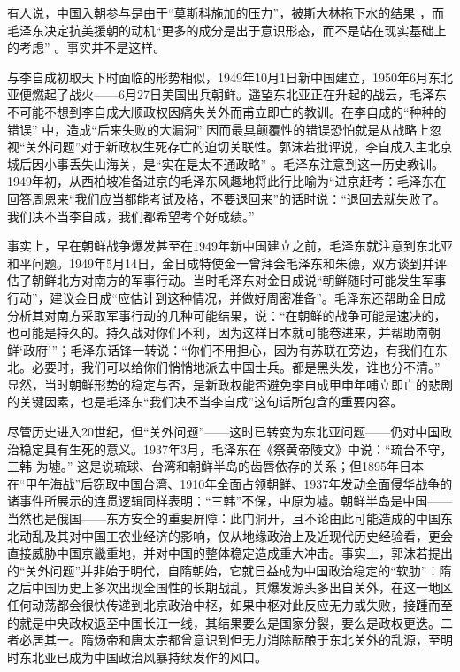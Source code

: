 \documentclass[UTF8, 12pt, a4paper]{ctexrep}
\begin{document}
有人说，中国入朝参与是由于“莫斯科施加的压力”，被斯大林拖下水的结果 ，而毛泽东决定抗美援朝的动机“更多的成分是出于意识形态，而不是站在现实基础上的考虑” 。事实并不是这样。

与李自成初取天下时面临的形势相似，1949年10月1日新中国建立，1950年6月东北亚便燃起了战火——6月27日美国出兵朝鲜。遥望东北亚正在升起的战云，毛泽东不可能不想到李自成大顺政权因痛失关外而甫立即亡的教训。在李自成的“种种的错误” 中，造成“后来失败的大漏洞” 因而最具颠覆性的错误恐怕就是从战略上忽视“关外问题”对于新政权生死存亡的迫切关联性。郭沫若批评说，李自成入主北京城后因小事丢失山海关，是“实在是太不通政略” 。毛泽东注意到这一历史教训。1949年初，从西柏坡准备进京的毛泽东风趣地将此行比喻为“进京赶考：毛泽东在回答周恩来“我们应当都能考试及格，不要退回来”的话时说：“退回去就失败了。我们决不当李自成，我们都希望考个好成绩。”

事实上，早在朝鲜战争爆发甚至在1949年新中国建立之前，毛泽东就注意到东北亚和平问题。1949年5月14日，金日成特使金一曾拜会毛泽东和朱德，双方谈到并评估了朝鲜北方对南方的军事行动。当时毛泽东对金日成说“朝鲜随时可能发生军事行动”，建议金日成“应估计到这种情况，并做好周密准备”。毛泽东还帮助金日成分析其对南方采取军事行动的几种可能结果，说：“在朝鲜的战争可能是速决的，也可能是持久的。持久战对你们不利，因为这样日本就可能卷进来，并帮助南朝鲜‘政府’”；毛泽东话锋一转说：“你们不用担心，因为有苏联在旁边，有我们在东北。必要时，我们可以给你们悄悄地派去中国士兵。都是黑头发，谁也分不清。” 显然，当时朝鲜形势的稳定与否，是新政权能否避免李自成甲申年哺立即亡的悲剧的关键因素，也是毛泽东“我们决不当李自成”这句话所包含的重要内容。

尽管历史进入20世纪，但“关外问题”——这时已转变为东北亚问题——仍对中国政治稳定具有生死的意义。1937年3月，毛泽东在《祭黄帝陵文》中说：“琉台不守，三韩 为墟。” 这是说琉球、台湾和朝鲜半岛的齿唇依存的关系；但1895年日本在“甲午海战”后窃取中国台湾、1910年全面占领朝鲜、1937年发动全面侵华战争的诸事件所展示的连贯逻辑同样表明：“三韩”不保，中原为墟。朝鲜半岛是中国——当然也是俄国——东方安全的重要屏障：此门洞开，且不论由此可能造成的中国东北动乱及其对中国工农业经济的影响，仅从地缘政治上及近现代历史经验看，更会直接威胁中国京畿重地，并对中国的整体稳定造成重大冲击。事实上，郭沫若提出的“关外问题”并非始于明代，自隋朝始，它就日益成为中国政治稳定的“软肋”：隋之后中国历史上多次出现全国性的长期战乱，其爆发源头多出自关外，在这一地区任何动荡都会很快传递到北京政治中枢，如果中枢对此反应无力或失败，接踵而至的就是中央政权退至中国长江一线，其结果要么是国家分裂，要么是政权更迭。二者必居其一。隋炀帝和唐太宗都曾意识到但无力消除酝酿于东北关外的乱源，至明时东北亚已成为中国政治风暴持续发作的风口。
\end{document}
